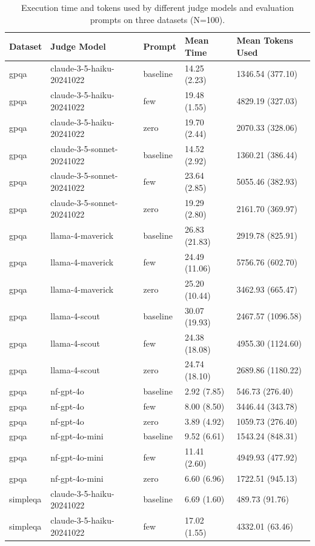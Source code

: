 \begin{table}[htbp]
\caption{Execution time and tokens used by different judge models and evaluation prompts on three datasets (N=100).}
\label{tab:expcostsuni}
\begin{tabular}{lllll}
\toprule
Dataset & Judge Model & Prompt & Mean Time & Mean Tokens Used \\
\midrule
gpqa & claude-3-5-haiku-20241022 & baseline &  14.25 (2.23) & 1346.54 (377.10) \\
gpqa & claude-3-5-haiku-20241022 & few &  19.48 (1.55) & 4829.19 (327.03) \\
gpqa & claude-3-5-haiku-20241022 & zero &  19.70 (2.44) & 2070.33 (328.06) \\
gpqa & claude-3-5-sonnet-20241022 & baseline &  14.52 (2.92) & 1360.21 (386.44) \\
gpqa & claude-3-5-sonnet-20241022 & few &  23.64 (2.85) & 5055.46 (382.93) \\
gpqa & claude-3-5-sonnet-20241022 & zero &  19.29 (2.80) & 2161.70 (369.97) \\
gpqa & llama-4-maverick & baseline &  26.83 (21.83) & 2919.78 (825.91) \\
gpqa & llama-4-maverick & few &  24.49 (11.06) & 5756.76 (602.70) \\
gpqa & llama-4-maverick & zero &  25.20 (10.44) & 3462.93 (665.47) \\
gpqa & llama-4-scout & baseline &  30.07 (19.93) & 2467.57 (1096.58) \\
gpqa & llama-4-scout & few &  24.38 (18.08) & 4955.30 (1124.60) \\
gpqa & llama-4-scout & zero &  24.74 (18.10) & 2689.86 (1180.22) \\
gpqa & nf-gpt-4o & baseline &   2.92 (7.85) & 546.73 (276.40) \\
gpqa & nf-gpt-4o & few &   8.00 (8.50) & 3446.44 (343.78) \\
gpqa & nf-gpt-4o & zero &   3.89 (4.92) & 1059.73 (276.40) \\
gpqa & nf-gpt-4o-mini & baseline &   9.52 (6.61) & 1543.24 (848.31) \\
gpqa & nf-gpt-4o-mini & few &  11.41 (2.60) & 4949.93 (477.92) \\
gpqa & nf-gpt-4o-mini & zero &   6.60 (6.96) & 1722.51 (945.13) \\
simpleqa & claude-3-5-haiku-20241022 & baseline &   6.69 (1.60) & 489.73 (91.76) \\
simpleqa & claude-3-5-haiku-20241022 & few &  17.02 (1.55) & 4332.01 (63.46) \\

\end{tabular}
\end{table}
